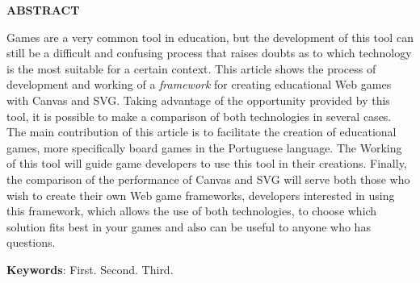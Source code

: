 \vfill
\begin{center}
{\textbf{ABSTRACT}\\}
\end{center}

\noindent

Games are a very common tool in education, but the development of this tool can still be a difficult and confusing process that raises doubts as to which technology is the most suitable for a certain context. This article shows the process of development and working of a \textit{framework} for creating educational Web games with Canvas and SVG. Taking advantage of the opportunity provided by this tool, it is possible to make a comparison of both technologies in several cases. The main contribution of this article is to facilitate the creation of educational games, more specifically board games in the Portuguese language. The Working of this tool will guide game developers to use this tool in their creations. Finally, the comparison of the performance of Canvas and SVG will serve both those who wish to create their own Web game frameworks, developers interested in using this framework, which allows the use of both technologies, to choose which solution fits best in your games and  also can be useful to anyone who has questions.
 
 \vspace{\onelineskip}
    
 \noindent
 \textbf{Keywords}: First. Second. Third.
